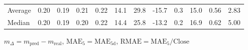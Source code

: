 \begin{threeparttable}
{\begin{tabular}{lrrrrrrrrrrr}
Average &          0.20 &          0.19 &          0.21 &        0.22 &                14.1 &                29.8 &      -15.7 &                 0.3 &             15.0 &            0.56 &                   2.83 \\
 Median &          0.20 &          0.19 &          0.20 &        0.22 &                14.4 &                25.8 &      -13.2 &                 0.2 &             16.9 &            0.62 &                   5.00 \\
\bottomrule
\end{tabular}
}
\begin{tablenotes}\footnotesize
\item $m_\Delta=m_{\text{pred}}-m_{\text{real}}$,
$\mathrm{MAE}_5=\mathrm{MAE}_{5\text{d}}$,
$\mathrm{RMAE}=\mathrm{MAE}_5/\text{Close}$
\end{tablenotes}
\end{threeparttable}
\endgroup

